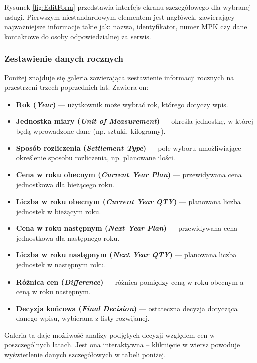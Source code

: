 Rysunek \ref{fig:EditForm} przedstawia interfejs ekranu szczegółowego dla wybranej usługi. Pierwszym niestandardowym elementem jest nagłówek, zawierający najważniejsze informacje takie jak: nazwa, identyfikator, numer MPK czy dane kontaktowe do osoby odpowiedzialnej za serwis.
\subsubsection*{Zestawienie danych rocznych}
 Poniżej znajduje się galeria zawierająca zestawienie informacji rocznych na przestrzeni trzech poprzednich lat. Zawiera on:
 \begin{itemize}
    \item \textbf{Rok (\emph{Year})} — użytkownik może wybrać rok, którego dotyczy wpis.
    \item \textbf{Jednostka miary (\emph{Unit of Measurement})} — określa jednostkę, w której będą wprowadzone dane (np. sztuki, kilogramy).
    \item \textbf{Sposób rozliczenia (\emph{Settlement Type})} — pole wyboru umożliwiające określenie sposobu rozliczenia, np. planowane ilości.
    \item \textbf{Cena w roku obecnym (\emph{Current Year Plan})} — przewidywana cena jednostkowa dla bieżącego roku.
    \item \textbf{Liczba w roku obecnym (\emph{Current Year QTY})} — planowana liczba jednostek w bieżącym roku.
    \item \textbf{Cena w roku następnym (\emph{Next Year Plan})} — przewidywana cena jednostkowa dla następnego roku.
    \item \textbf{Liczba w roku następnym (\emph{Next Year QTY})} — planowana liczba jednostek w następnym roku.
    \item \textbf{Różnica cen (\emph{Difference})} — różnica pomiędzy ceną w roku obecnym a ceną w roku następnym.
    \item \textbf{Decyzja końcowa (\emph{Final Decision})} — ostateczna decyzja dotycząca danego wpisu, wybierana z listy rozwijanej.
   \end{itemize}

Galeria ta daje możliwość analizy podjętych decyzji względem cen w poszczególnych latach. Jest ona interaktywna -- kliknięcie w wiersz powoduje wyświetlenie danych szczegółowych w tabeli poniżej.
